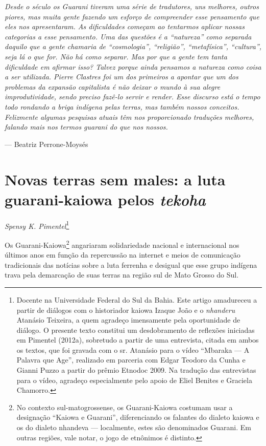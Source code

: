 \begin{minipage}[c]{0.85\textwidth}

\emph{Desde o século  os Guarani tiveram uma série de tradutores, uns
melhores, outros piores, mas muita gente fazendo um esforço de
compreender esse pensamento que eles nos apresentaram. As dificuldades
começam ao tentarmos aplicar nossas categorias a esse pensamento. Uma
das questões é a ``natureza'' como separada daquilo que a gente chamaria de
``cosmologia'', ``religião'', ``metafísica'', ``cultura'', seja lá o que for. Não há
como separar. Mas por que a gente tem tanta dificuldade em afirmar
isso? Talvez porque ainda pensamos a natureza como coisa a ser
utilizada. Pierre Clastres foi um dos primeiros a apontar que um dos
problemas da expansão capitalista é não deixar o mundo à sua alegre
improdutividade, sendo preciso fazê-lo servir e render. Esse discurso
está o tempo todo rondando a briga indígena pelas terras, mas também
nossos conceitos. Felizmente algumas pesquisas atuais têm nos
proporcionado traduções melhores, falando mais nos termos guarani do
que nos nossos.}

\smallskip
\hspace*{\fill}--- Beatriz Perrone-Moysés
\end{minipage}


\chapter{Novas terras sem males: a luta guarani-kaiowa pelos \emph{tekoha}}
\begin{flushright}
\emph{Spensy K. Pimentel}\footnote{Docente na Universidade Federal do Sul da
Bahia. Este artigo amadureceu a partir de diálogos com o historiador
kaiowa Izaque João e o \emph{nhanderu} Atanásio Teixeira, a quem agradeço
imensamente pela oportunidade de diálogo. O presente texto constitui um
desdobramento de reflexões iniciadas em Pimentel (2012a), sobretudo a
partir de uma entrevista, citada em ambos os textos, que foi gravada
com o sr. Atanásio para o vídeo ``Mbaraka --- A Palavra que Age'',
realizado em parceria com Edgar Teodoro da Cunha e Gianni Puzzo a
partir do prêmio Etnodoc 2009. Na tradução das entrevistas para o
vídeo, agradeço especialmente pelo apoio de Eliel Benites e Graciela
Chamorro.} 
\end{flushright}

Os Guarani-Kaiowa\footnote{No contexto sul-matogrossense, os
Guarani-Kaiowa costumam usar a designação ``Kaiowa e Guarani'',
diferenciando os falantes do dialeto kaiowa e os do dialeto nhandeva ---
localmente, estes são denominados Guarani. Em outras regiões, vale
notar, o jogo de etnônimos é distinto.} angariaram solidariedade
nacional e internacional nos últimos anos em função da repercussão na
internet e meios de comunicação tradicionais das notícias sobre a luta
ferrenha e desigual que esse grupo indígena trava pela demarcação de
suas terras na região sul de Mato Grosso do Sul.

